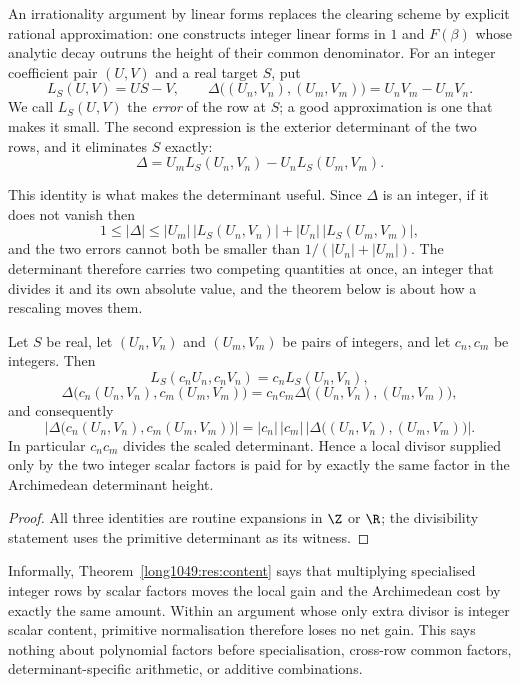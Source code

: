 \documentclass[11pt]{article}
\begin{document}
An irrationality argument by linear forms replaces the clearing scheme by
explicit rational approximation: one constructs integer linear forms in $1$ and
$F(\beta)$ whose analytic decay outruns the height of their common denominator.
For an integer coefficient pair \((U,V)\) and a real target \(S\), put
\[
 L_S(U,V)=US-V,
 \qquad
 \Delta\bigl((U_n,V_n),(U_m,V_m)\bigr)=U_nV_m-U_mV_n.
\]
We call \(L_S(U,V)\) the \emph{error} of the row at \(S\); a good approximation
is one that makes it small.  The second expression is the exterior determinant
of the two rows, and it eliminates \(S\) exactly:
\[
\Delta=U_mL_S(U_n,V_n)-U_nL_S(U_m,V_m).
\]

This identity is what makes the determinant useful.  Since \(\Delta\) is an
integer, if it does not vanish then
\[
 1\le|\Delta|
  \le|U_m|\,\bigl|L_S(U_n,V_n)\bigr|+|U_n|\,\bigl|L_S(U_m,V_m)\bigr|,
\]
and the two errors cannot both be smaller than
\(1/(|U_n|+|U_m|)\).  The determinant therefore carries two competing
quantities at once, an integer that divides it and its own absolute value, and
the theorem below is about how a rescaling moves them.

\begin{theorem}\label{long1049:res:content}
Let \(S\) be real, let \((U_n,V_n)\) and \((U_m,V_m)\) be pairs of integers, and
let \(c_n,c_m\) be integers.  Then
\[
 L_S(c_nU_n,c_nV_n)=c_nL_S(U_n,V_n),
\]
\[
 \Delta\bigl(c_n(U_n,V_n),c_m(U_m,V_m)\bigr)
 =c_nc_m\Delta\bigl((U_n,V_n),(U_m,V_m)\bigr),
\]
and consequently
\[
 \left|\Delta\bigl(c_n(U_n,V_n),c_m(U_m,V_m)\bigr)\right|
 =|c_n|\,|c_m|\,
   \left|\Delta\bigl((U_n,V_n),(U_m,V_m)\bigr)\right|.
\]
In particular \(c_nc_m\) divides the scaled determinant.  Hence a local
divisor supplied only by the two integer scalar factors is paid for by exactly
the same factor in the Archimedean determinant height.
\end{theorem}

\begin{proof}
All three identities are routine expansions in \(\Z\) or \(\R\); the
divisibility statement uses the primitive determinant as its witness.
\end{proof}

Informally, Theorem~\ref{long1049:res:content} says that multiplying specialised integer
rows by scalar factors moves the local gain and the Archimedean cost by exactly
the same amount.  Within an argument whose only extra divisor is integer scalar
content, primitive normalisation therefore loses no net gain.  This says
nothing about polynomial factors before specialisation, cross-row common
factors, determinant-specific arithmetic, or additive combinations.
\end{document}
